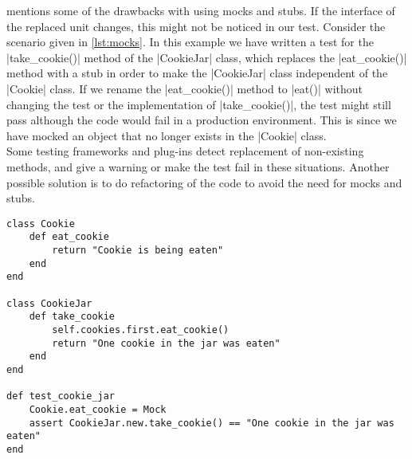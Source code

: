 \citet{video:boundaries} mentions some of the drawbacks with using mocks
and stubs. If the interface of the replaced unit changes, this might not
be noticed in our test. Consider the scenario given in \ref{lst:mocks}.
In this example we have written a test for the |take_cookie()| method of
the |CookieJar| class, which replaces the |eat_cookie()| method with a
stub in order to make the |CookieJar| class independent of the |Cookie|
class. If we rename the |eat_cookie()| method to |eat()| without
changing the test or the implementation of |take_cookie()|, the test
might still pass although the code would fail in a production
environment. This is since we have mocked an object that no longer
exists in the |Cookie| class.\\

Some testing frameworks and plug-ins detect replacement of non-existing
methods, and give a warning or make the test fail in these situations.
Another possible solution is to do refactoring of the code to avoid the
need for mocks and stubs. \cite{video:boundaries}\\

\begin{lstlisting}[caption=Example of how mocking might make tests unaware
                           of changes which breaks functionality.,
                   label=lst:mocks, float=t]
class Cookie
    def eat_cookie
        return "Cookie is being eaten"
    end
end

class CookieJar
    def take_cookie
        self.cookies.first.eat_cookie()
        return "One cookie in the jar was eaten"
    end
end

def test_cookie_jar
    Cookie.eat_cookie = Mock
    assert CookieJar.new.take_cookie() == "One cookie in the jar was eaten"
end
\end{lstlisting}

